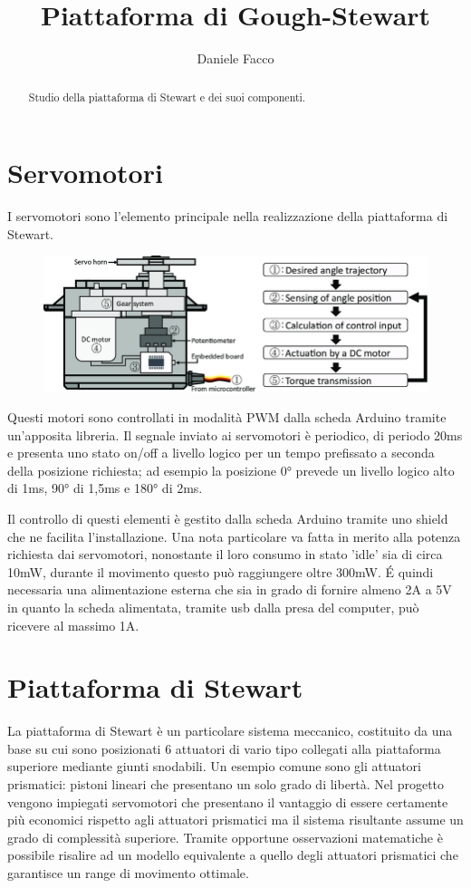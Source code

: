 \documentclass[11pt]{article}
\title{Piattaforma di Gough-Stewart}
\author{Daniele Facco}
\date{}
\begin{document}
\maketitle
\tableofcontents
\newpage

\begin{abstract}
Studio della piattaforma di Stewart e dei suoi componenti.
\end{abstract}

\section{Servomotori}\label{servomotori}
I servomotori sono l'elemento principale nella realizzazione della piattaforma di Stewart.

\begin{figure}[h!]
\centering
\includegraphics[scale=0.3]{Schematic-of-an-RC-servo-motor.png}
\end{figure}

Questi motori sono controllati in modalità PWM dalla scheda Arduino tramite un'apposita libreria. Il segnale inviato ai servomotori è periodico, di periodo 20ms e presenta uno stato on/off a livello logico per un tempo prefissato a seconda della posizione richiesta; ad esempio la posizione 0° prevede un livello logico alto di 1ms, 90° di 1,5ms e 180° di 2ms.

Il controllo di questi elementi è gestito dalla scheda Arduino tramite uno shield che ne facilita l'installazione. Una nota particolare va fatta in merito alla potenza richiesta dai servomotori, nonostante il loro consumo in stato 'idle' sia di circa 10mW, durante il movimento questo può raggiungere oltre 300mW. É quindi necessaria una alimentazione esterna che sia in grado di fornire almeno 2A a 5V in quanto la scheda alimentata, tramite usb dalla presa del computer, può ricevere al massimo 1A.

\section{Piattaforma di Stewart}\label{piattaformastewart}
La piattaforma di Stewart è un particolare sistema meccanico, costituito da una base su cui sono posizionati 6 attuatori di vario tipo collegati alla piattaforma superiore mediante giunti snodabili. Un esempio comune sono gli attuatori prismatici: pistoni lineari che presentano un solo grado di libertà. Nel progetto vengono impiegati servomotori che presentano il vantaggio di essere certamente più economici rispetto agli attuatori prismatici ma il sistema risultante assume un grado di complessità superiore. Tramite opportune osservazioni matematiche è possibile risalire ad un modello equivalente a quello degli attuatori prismatici che garantisce un range di movimento ottimale.
\end{document}
